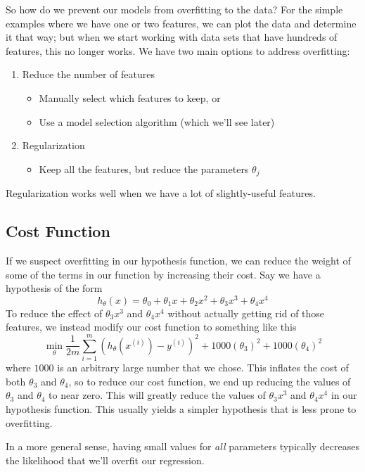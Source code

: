 So how do we prevent our models from overfitting to the data? For the simple examples where we have one or two features, we can plot the data and determine it that way; but when we start working with data sets that have hundreds of features, this no longer works. We have two main options to address overfitting:
\begin{enumerate}
\item Reduce the number of features
	\begin{itemize}
	\item Manually select which features to keep, or
	\item Use a model selection algorithm (which we'll see later)
	\end{itemize}
\item Regularization
	\begin{itemize}
	\item Keep all the features, but reduce the parameters $\theta_j$
	\end{itemize}
\end{enumerate}
Regularization works well when we have a lot of slightly-useful features. 

\subsection{Cost Function}
If we suspect overfitting in our hypothesis function, we can reduce the weight of some of the terms in our function by increasing their cost. Say we have a hypothesis of the form
$$
h_\theta\left(x\right) = \theta_0 + \theta_1x + \theta_2x^2 + \theta_3x^3 + \theta_4x^4
$$
To reduce the effect of $\theta_3x^3$ and $\theta_4x^4$ without actually getting rid of those features, we instead modify our cost function to something like this
$$
\min_\theta \frac{1}{2m} \sum_{i=1}^m \left(h_\theta \left(x ^{\left(i\right)}\right) - y^{\left(i\right)}\right)^2 + 1000\left(\theta_3\right)^2 + 1000 \left(\theta_4\right)^2
$$
where $1000$ is an arbitrary large number that we chose. This inflates the cost of both $\theta_3$ and $\theta_4$, so to reduce our cost function, we end up reducing the values of $\theta_3$ and $\theta_4$ to near zero. This will greatly reduce the values of $\theta_3x^3$ and $\theta_4x^4$ in our hypothesis function. This usually yields a simpler hypothesis that is less prone to overfitting. 

In a more general sense, having small values for \textit{all} parameters typically decreases the likelihood that we'll overfit our regression. 

